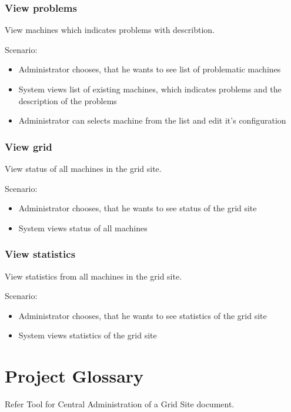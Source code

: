 \documentclass[12pt]{article}
\begin{document}
\subsubsection{View problems}
View machines which indicates problems with describtion.

Scenario:
\begin{itemize}
\item{Administrator chooses, that he wants to see list of problematic machines}
\item{System views list of existing machines, which indicates problems and the description of the problems}
\item{Administrator can selects machine from the list and edit it's configuration}
\end{itemize}

\subsubsection{View grid}
View status of all machines in the grid site.

Scenario:
\begin{itemize}
\item{Administrator chooses, that he wants to see status of the grid site}
\item{System views status of all machines}
\end{itemize}

\subsubsection{View statistics}
View statistics from all machines in the grid site.

Scenario:
\begin{itemize}
\item{Administrator chooses, that he wants to see statistics of the grid site}
\item{ System views statistics of the grid site}
\end{itemize}

\section{Project Glossary}

Refer Tool for Central Administration of a Grid Site document.
\end{document}
